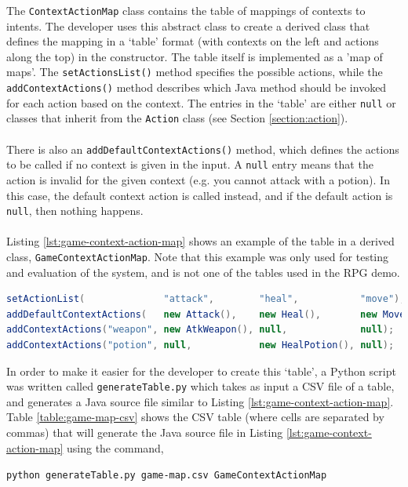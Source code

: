 \documentclass[11pt]{article}
\begin{document}
The \texttt{ContextActionMap} class contains the table of mappings of contexts to intents. The developer uses this abstract class to create a derived class that defines the mapping in a `table' format (with contexts on the left and actions along the top) in the constructor. The table itself is implemented as a 'map of maps'. The \texttt{setActionsList()} method specifies the possible actions, while the \texttt{addContextActions()} method describes which Java method should be invoked for each action based on the context. The entries in the `table' are either \texttt{null} or classes that inherit from the \texttt{Action} class (see Section \ref{section:action}).
\\
\\
There is also an \texttt{addDefaultContextActions()} method, which defines the actions to be called if no context is given in the input. A \texttt{null} entry means that the action is invalid for the given context (e.g. you cannot attack with a potion). In this case, the default context action is called instead, and if the default action is \texttt{null}, then nothing happens.
\\
\\
Listing \ref{lst:game-context-action-map} shows an example of the table in a derived class, \texttt{GameContextActionMap}. Note that this example was only used for testing and evaluation of the system, and is not one of the tables used in the RPG demo.

\begin{lstlisting}[language=Java, caption=Example of a ContextActionMap 'table', label={lst:game-context-action-map}]
setActionList(              "attack",        "heal",           "move");
addDefaultContextActions(   new Attack(),    new Heal(),       new Move());
addContextActions("weapon", new AtkWeapon(), null,             null);
addContextActions("potion", null,            new HealPotion(), null);
\end{lstlisting}

In order to make it easier for the developer to create this `table', a Python script was written called \texttt{generateTable.py} which takes as input a CSV file of a table, and generates a Java source file similar to Listing \ref{lst:game-context-action-map}. Table \ref{table:game-map-csv} shows the CSV table (where cells are separated by commas) that will generate the Java source file in Listing \ref{lst:game-context-action-map} using the command, 

\begin{center}
\texttt{python generateTable.py game-map.csv GameContextActionMap}
\end{center}
\end{document}
